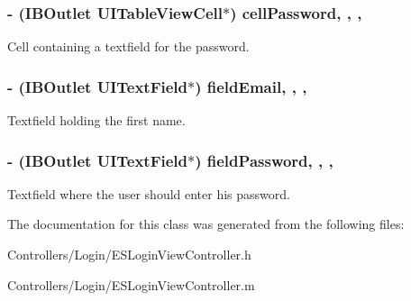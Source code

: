 \subsubsection[{cell\+Password}]{\setlength{\rightskip}{0pt plus 5cm}-\/ (I\+B\+Outlet U\+I\+Table\+View\+Cell$\ast$) cell\+Password\hspace{0.3cm}{\ttfamily [read]}, {\ttfamily [write]}, {\ttfamily [nonatomic]}, {\ttfamily [strong]}}\label{interface_e_s_login_view_controller_a17fc8e4a369db0b8b6f10dbe149dd5be}
Cell containing a textfield for the password. \hypertarget{interface_e_s_login_view_controller_aa873ba82f5187014eaee65b33ecd3093}{}
\subsubsection[{field\+Email}]{\setlength{\rightskip}{0pt plus 5cm}-\/ (I\+B\+Outlet U\+I\+Text\+Field$\ast$) field\+Email\hspace{0.3cm}{\ttfamily [read]}, {\ttfamily [write]}, {\ttfamily [nonatomic]}, {\ttfamily [strong]}}\label{interface_e_s_login_view_controller_aa873ba82f5187014eaee65b33ecd3093}
Textfield holding the first name. \hypertarget{interface_e_s_login_view_controller_adb60a47399173970c9523e1acaecb78c}{}
\subsubsection[{field\+Password}]{\setlength{\rightskip}{0pt plus 5cm}-\/ (I\+B\+Outlet U\+I\+Text\+Field$\ast$) field\+Password\hspace{0.3cm}{\ttfamily [read]}, {\ttfamily [write]}, {\ttfamily [nonatomic]}, {\ttfamily [strong]}}\label{interface_e_s_login_view_controller_adb60a47399173970c9523e1acaecb78c}
Textfield where the user should enter his password. 

The documentation for this class was generated from the following files\+:\begin{DoxyCompactItemize}
\item 
Controllers/\+Login/E\+S\+Login\+View\+Controller.\+h\item 
Controllers/\+Login/E\+S\+Login\+View\+Controller.\+m\end{DoxyCompactItemize}
